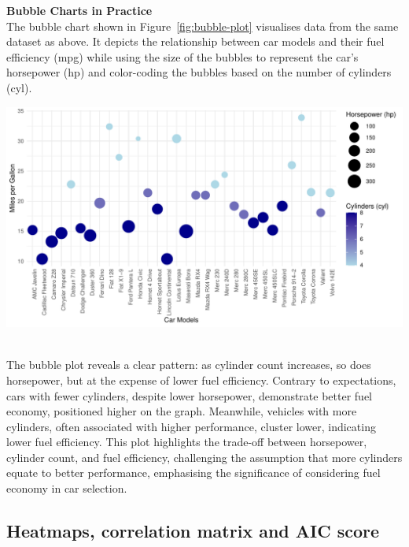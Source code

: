 \documentclass{article}\usepackage[]{graphicx}\usepackage[]{xcolor}
\makeatletter
\def\maxwidth{ %
  \ifdim\Gin@nat@width>\linewidth
    \linewidth
  \else
    \Gin@nat@width
  \fi
}
\newenvironment{knitrout}{}{} %
\makeatother
\begin{document}
\noindent
\textbf{Bubble Charts in Practice}\\
\noident The bubble chart shown in Figure~\ref{fig:bubble-plot} visualises data from the same dataset as above. It depicts the relationship between car models and their fuel efficiency (mpg) while using the size of the bubbles to represent the car's horsepower (hp) and color-coding the bubbles based on the number of cylinders (cyl).\\

\begin{knitrout}\scriptsize
{}\color{fgcolor}

{\centering \includegraphics[width=\maxwidth]{figure/beamer-bubble-plot-1} 

}


\end{knitrout}

\\\noindent The bubble plot reveals a clear pattern: as cylinder count increases, so does horsepower, but at the expense of lower fuel efficiency. Contrary to expectations, cars with fewer cylinders, despite lower horsepower, demonstrate better fuel economy, positioned higher on the graph. Meanwhile, vehicles with more cylinders, often associated with higher performance, cluster lower, indicating lower fuel efficiency. This plot highlights the trade-off between horsepower, cylinder count, and fuel efficiency, challenging the assumption that more cylinders equate to better performance, emphasising the significance of considering fuel economy in car selection.

\subsection{Heatmaps, correlation matrix and AIC score}
\end{document}
